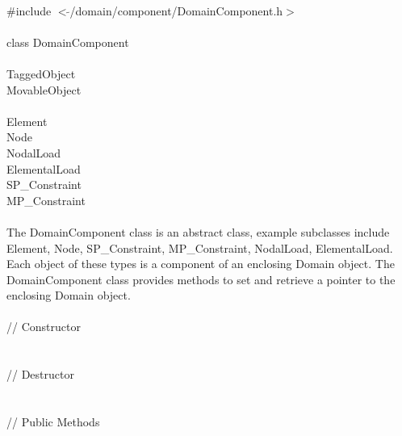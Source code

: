 
   \\
\indent \#include $<\tilde{ }$/domain/component/DomainComponent.h$>$  \\

  \\
\indent class DomainComponent \\

 \\
\indent  TaggedObject \\
\indent  MovableObject \\
\indent{} \\
\indent\indent\indent  Element \\
\indent\indent\indent  Node \\
\indent\indent\indent  NodalLoad \\
\indent\indent\indent  ElementalLoad \\
\indent\indent\indent  SP\_Constraint \\
\indent\indent\indent  MP\_Constraint \\

  \\
\indent The DomainComponent class is an abstract class, example
subclasses include Element, Node, SP\_Constraint, MP\_Constraint,
NodalLoad, ElementalLoad. Each object of these types is a component of
an enclosing Domain object. The DomainComponent class provides methods
to set and retrieve a pointer to the enclosing Domain object. \\

  \\
\indent\indent // Constructor  \\
\indent{}  \\ \\
\indent\indent // Destructor  \\
\indent{}  \\ \\
\indent\indent // Public Methods  \\
\indent{} \\
\indent{}\\
\indent{} \\

